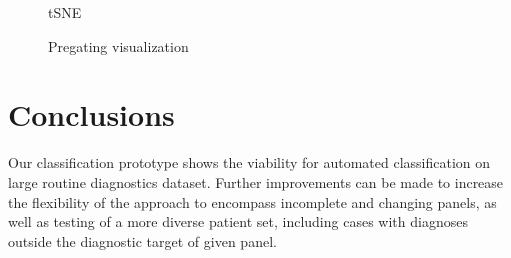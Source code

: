 \documentclass[11pt,a4paper]{article}
\begin{document}
\begin{figure}
   \caption{tSNE}
\end{figure}

\begin{figure}
   \caption{Pregating visualization}
\end{figure}

\section{Conclusions}

Our classification prototype shows the viability for automated classification on large routine diagnostics dataset.
Further improvements can be made to increase the flexibility of the approach to encompass incomplete and changing panels, as well as testing of a more diverse patient set, including cases with diagnoses outside the diagnostic target of given panel.





\end{document}
